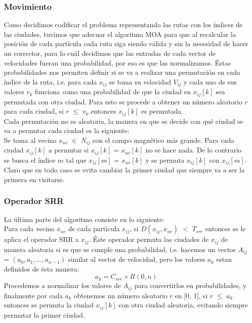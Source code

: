 \documentclass[12pt]{article}
\begin{document}
\subsubsection*{Movimiento}
Como decidimos codificar el problema representando las rutas con los índices de las ciudades, tuvimos que adecuar el algoritmo MOA para que al recalcular la posición de cada partícula cada ruta siga siendo válida y sin la necesidad de hacer un corrector, para lo cuál decidimos que las entradas de cada vector de velocidades fueran una probabilidad, por eso es que las normalizamos. Éstas probabilidades nos permiten definir si se va a realizar una permutación en cada índice de la ruta, i.e. para cada $x_{ij}$ se toma su velocidad $V_{ij}$ y cada uno de sus valores $v_k$ funciona como una probabilidad de que la ciudad en $x_{ij}[k]$ sea permutada con otra ciudad. Para esto se procede a obtener un número aleatorio $r$ para cada ciudad, si $r$ $\leqslant$ $v_k$ entonces $x_{ij}[k]$ es permutada. \\

\noindent Cada permutación no es aleatoria, la manera en que se decide con qué ciudad se va a permutar cada ciudad es la siguiente: \\

\noindent Se toma al vecino $x_{uv}$ $\in$ $N_{ij}$ con el campo magnético más grande. Para cada ciudad $x_{ij}[k]$ a permutar
si $x_{ij}[k]$ = $x_{uv}[k]$ no se hace nada. De lo contrario se busca el índice $m$ tal que $x_{ij}[m]$ = $x_{uv}[k]$ y se permuta $x_{ij}[k]$ con $x_{ij}[m]$. Claro que en todo caso se evita cambiar la primer ciudad que siempre va a ser la primera en visitarse.

\subsubsection*{Operador SRR}

La última parte del algoritmo consiste en lo siguiente: \\
Para cada vecino $x_{uv}$  de cada partícula $x_{ij}$, si $D(x_{ij}, x_{uv})$ $<$ $T_{srr}$ entonces se le aplica el operador SRR a $x_{ij}$. Éste operador permuta las ciudades de $x_{ij}$ de manera aleatoria si es que se cumple una probabilidad, i.e. hacemos un vector
$A_{ij}$ = $(a_0, a_1,...,a_{n-1})$ similar al vector de velocidad, pero los valores $a_k$ estan definidos de ésta manera:
\begin{equation}
  a_k = C_{srr} \times R(0, n)
\end{equation}
Procedemos a normalizar los valores de $A_{ij}$ para convertirlos en probabilidades, y finalmente por cada $a_k$ obtenemos un número aleatorio $r$ en [0, 1], si $r$ $\leqslant$ $a_k$ entonces se permuta la ciudad $x_{ij}[k]$ con otra ciudad aleatoria, evitando siempre permutar la primer ciudad.
\newpage
\end{document}
